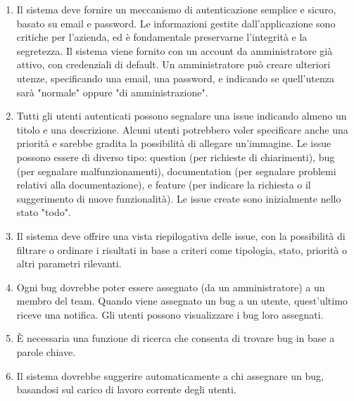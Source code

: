 \begin{enumerate}
  \item Il sistema deve fornire un meccanismo di autenticazione semplice e sicuro, basato su email e
        password. Le informazioni gestite dall’applicazione sono critiche per l’azienda, ed è fondamentale preservarne l’integrità e la segretezza. Il sistema viene fornito con un account da amministratore già attivo, con credenziali di default. Un amministratore può creare ulteriori utenze, specificando una email, una password, e indicando se quell’utenza sarà "normale" oppure "di amministrazione".
  \item Tutti gli utenti autenticati possono segnalare una issue indicando almeno un titolo e una
        descrizione. Alcuni utenti potrebbero voler specificare anche una priorità e sarebbe gradita la possibilità di allegare un’immagine. Le issue possono essere di diverso tipo: question (per richieste di chiarimenti), bug (per segnalare malfunzionamenti), documentation (per segnalare problemi relativi alla documentazione), e feature (per indicare la richiesta o il suggerimento di nuove funzionalità). Le issue create sono inizialmente nello stato "todo".
  \item Il sistema deve offrire una vista riepilogativa delle issue, con la possibilità di filtrare        o ordinare i risultati in base a criteri come tipologia, stato, priorità o altri parametri         rilevanti.
  \item Ogni bug dovrebbe poter essere assegnato (da un amministratore) a un membro del team. Quando
        viene assegnato un bug a un utente, quest’ultimo riceve una notifica. Gli utenti possono
        visualizzare i bug loro assegnati.
  \item È necessaria una funzione di ricerca che consenta di trovare bug in base a parole chiave.
  \item Il sistema dovrebbe suggerire automaticamente a chi assegnare un bug, basandosi sul carico di
        lavoro corrente degli utenti.
\end{enumerate}

